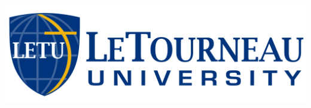 \begin{titlepage}

{\large \datef{}}\\[2cm] %

\vfill %
\includegraphics[scale=0.20]{logoHoriz.jpg}\\[1cm] %
 

\end{titlepage}